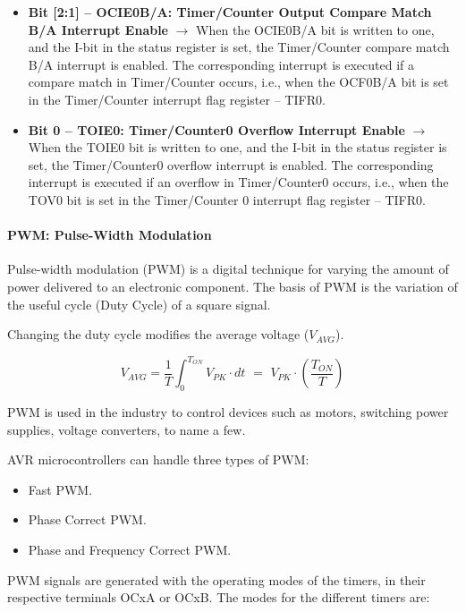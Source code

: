 \begin{itemize}
    \item \textbf{Bit [2:1] – OCIE0B/A: Timer/Counter Output Compare Match B/A Interrupt Enable} $\bm{\rightarrow}$ When the OCIE0B/A bit is written to one, and the I-bit in the status register is set, the Timer/Counter compare match B/A interrupt is enabled. The corresponding interrupt is executed if a compare match in Timer/Counter occurs, i.e., when the OCF0B/A bit is set in the Timer/Counter interrupt flag register – TIFR0.
    
    \item \textbf{Bit 0 – TOIE0: Timer/Counter0 Overflow Interrupt Enable} $\bm{\rightarrow}$ When the TOIE0 bit is written to one, and the I-bit in the status register is set, the Timer/Counter0 overflow interrupt is enabled. The corresponding interrupt is executed if an overflow in Timer/Counter0 occurs, i.e., when the TOV0 bit is set in the Timer/Counter 0 interrupt flag register – TIFR0.
\end{itemize}

\paragraph{PWM: Pulse-Width Modulation}

Pulse-width modulation (PWM) is a digital technique for varying the amount of power delivered to an
electronic component. The basis of PWM is the variation of the useful cycle (Duty Cycle) of a square signal.\medskip

Changing the duty cycle modifies the average voltage ($V_{AVG}$).

\begin{equation*}
    V_{AVG} = \frac{1}{T} \int_0^{T_{ON}}{V_{PK}\cdot dt\,\,=\,\,V_{PK}\cdot \left( \frac{T_{ON}}{T} \right)}
\end{equation*}

PWM is used in the industry to control devices such as motors, switching power supplies, voltage converters, to name a few.

AVR microcontrollers can handle three types of PWM:

\begin{itemize}
    \item Fast PWM.
    \item Phase Correct PWM.
    \item Phase and Frequency Correct PWM.
\end{itemize}

PWM signals are generated with the operating modes of the timers, in their respective terminals OCxA or OCxB. The modes for the different timers are:

